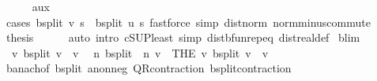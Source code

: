 \begin{isabellebody}
\ \ \ \ \isamarkupfalse%
\ aux\isanewline
\ \ \ \ \isamarkupfalse%
\ {\isacharparenleft}{\kern0pt}cases\ {\isachardoublequoteopen}{\isasymL}\isactrlsub b{\isacharunderscore}{\kern0pt}split\ v\ s\ {\isasymle}\ {\isasymL}\isactrlsub b{\isacharunderscore}{\kern0pt}split\ u\ s{\isachardoublequoteclose}{\isacharparenright}{\kern0pt}\ {\isacharparenleft}{\kern0pt}fastforce\ simp{\isacharcolon}{\kern0pt}\ dist{\isacharunderscore}{\kern0pt}norm\ norm{\isacharunderscore}{\kern0pt}minus{\isacharunderscore}{\kern0pt}commute{\isacharparenright}{\kern0pt}{\isacharplus}{\kern0pt}\isanewline
\ \ \isamarkupfalse%
\ {\isacharquery}{\kern0pt}thesis\isanewline
\ \ \ \ \isamarkupfalse%
\ {\isacharparenleft}{\kern0pt}auto\ intro{\isacharbang}{\kern0pt}{\isacharcolon}{\kern0pt}\ cSUP{\isacharunderscore}{\kern0pt}least\ simp{\isacharcolon}{\kern0pt}\ dist{\isacharunderscore}{\kern0pt}bfun{\isachardot}{\kern0pt}rep{\isacharunderscore}{\kern0pt}eq\ dist{\isacharunderscore}{\kern0pt}real{\isacharunderscore}{\kern0pt}def{\isacharparenright}{\kern0pt}\isanewline
{}\isamarkupfalse%
%
\endisatagproof
{\isafoldproof}%
%
\isadelimproof
\isanewline
%
\endisadelimproof
\isanewline
{}\isamarkupfalse%
\ {\isasymL}\isactrlsub b{\isacharunderscore}{\kern0pt}lim{\isacharcolon}{\kern0pt}\isanewline
\ \ {\isachardoublequoteopen}{\isasymexists}{\isacharbang}{\kern0pt}v{\isachardot}{\kern0pt}\ {\isasymL}\isactrlsub b{\isacharunderscore}{\kern0pt}split\ v\ {\isacharequal}{\kern0pt}\ v{\isachardoublequoteclose}\isanewline
\ \ {\isachardoublequoteopen}{\isacharparenleft}{\kern0pt}{\isasymlambda}n{\isachardot}{\kern0pt}\ {\isacharparenleft}{\kern0pt}{\isasymL}\isactrlsub b{\isacharunderscore}{\kern0pt}split\ {\isacharcircum}{\kern0pt}{\isacharcircum}{\kern0pt}\ n{\isacharparenright}{\kern0pt}\ v{\isacharparenright}{\kern0pt}\ {\isasymlonglonglongrightarrow}\ {\isacharparenleft}{\kern0pt}THE\ v{\isachardot}{\kern0pt}\ {\isasymL}\isactrlsub b{\isacharunderscore}{\kern0pt}split\ v\ {\isacharequal}{\kern0pt}\ v{\isacharparenright}{\kern0pt}{\isachardoublequoteclose}\isanewline
%
\isadelimproof
\ \ %
\endisadelimproof
%
\isatagproof
{}\isamarkupfalse%
\ banach{\isacharprime}{\kern0pt}{\isacharbrackleft}{\kern0pt}of\ {\isasymL}\isactrlsub b{\isacharunderscore}{\kern0pt}split{\isacharbrackright}{\kern0pt}\ a{\isacharunderscore}{\kern0pt}nonneg\ QR{\isacharunderscore}{\kern0pt}contraction\ {\isasymL}\isactrlsub b{\isacharunderscore}{\kern0pt}split{\isacharunderscore}{\kern0pt}contraction\isanewline

\end{isabellebody}
